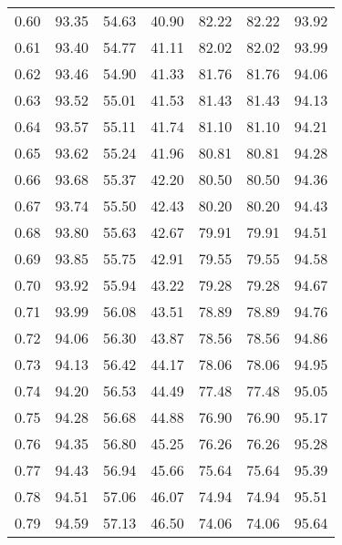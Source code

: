 \begin{tabular}{|c|c|c|c|c|c|c|}
      0.60 &     93.35 &     54.63 &      40.90 &   82.22 &      82.22 &         93.92 \\
      0.61 &     93.40 &     54.77 &      41.11 &   82.02 &      82.02 &         93.99 \\
      0.62 &     93.46 &     54.90 &      41.33 &   81.76 &      81.76 &         94.06 \\
      0.63 &     93.52 &     55.01 &      41.53 &   81.43 &      81.43 &         94.13 \\
      0.64 &     93.57 &     55.11 &      41.74 &   81.10 &      81.10 &         94.21 \\
      0.65 &     93.62 &     55.24 &      41.96 &   80.81 &      80.81 &         94.28 \\
      0.66 &     93.68 &     55.37 &      42.20 &   80.50 &      80.50 &         94.36 \\
      0.67 &     93.74 &     55.50 &      42.43 &   80.20 &      80.20 &         94.43 \\
      0.68 &     93.80 &     55.63 &      42.67 &   79.91 &      79.91 &         94.51 \\
      0.69 &     93.85 &     55.75 &      42.91 &   79.55 &      79.55 &         94.58 \\
      0.70 &     93.92 &     55.94 &      43.22 &   79.28 &      79.28 &         94.67 \\
      0.71 &     93.99 &     56.08 &      43.51 &   78.89 &      78.89 &         94.76 \\
      0.72 &     94.06 &     56.30 &      43.87 &   78.56 &      78.56 &         94.86 \\
      0.73 &     94.13 &     56.42 &      44.17 &   78.06 &      78.06 &         94.95 \\
      0.74 &     94.20 &     56.53 &      44.49 &   77.48 &      77.48 &         95.05 \\
      0.75 &     94.28 &     56.68 &      44.88 &   76.90 &      76.90 &         95.17 \\
      0.76 &     94.35 &     56.80 &      45.25 &   76.26 &      76.26 &         95.28 \\
      0.77 &     94.43 &     56.94 &      45.66 &   75.64 &      75.64 &         95.39 \\
      0.78 &     94.51 &     57.06 &      46.07 &   74.94 &      74.94 &         95.51 \\
      0.79 &     94.59 &     57.13 &      46.50 &   74.06 &      74.06 &         95.64 \\

\end{tabular}
